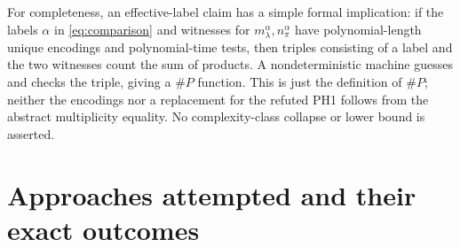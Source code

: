 \documentclass[11pt,a4paper]{article}
\theoremstyle{named}\newtheorem{finding}{Finding}[section]
\theoremstyle{definition}\newtheorem{definition}[finding]{Definition}
\theoremstyle{remark}\newtheorem{remark}[finding]{Remark}
\begin{document}
For completeness, an effective-label claim has a simple formal implication: if the labels $\alpha$ in \eqref{eq:comparison} and witnesses for $m_\lambda^\alpha,n_\pi^\alpha$ have polynomial-length unique encodings and polynomial-time tests, then triples consisting of a label and the two witnesses count the sum of products. A nondeterministic machine guesses and checks the triple, giving a \(\#P\) function. This is just the definition of \(\#P\); neither the encodings nor a replacement for the refuted PH1 follows from the abstract multiplicity equality. No complexity-class collapse or lower bound is asserted.

\section{Approaches attempted and their exact outcomes}
\end{document}
